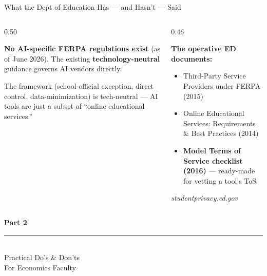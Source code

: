 \documentclass[aspectratio=169, 10pt]{beamer}
\newcommand{\cmcite}[1]{{\scriptsize\color{CoolGray}\textit{#1}}}
\begin{document}
\begin{frame}{What the Dept of Education Has --- and Hasn't --- Said}
\begin{columns}[T]
\begin{column}{0.50\textwidth}
\begin{tcolorbox}[keybox, title={\faGavel\quad No AI-specific rules}]
\small \textbf{No AI-specific FERPA regulations exist} (as of June 2026). The existing \textbf{technology-neutral} guidance governs AI vendors directly.
\end{tcolorbox}
\vskip4pt
\begin{tcolorbox}[quotebox, top=3pt, bottom=3pt]
\scriptsize The framework (school-official exception, direct control, data-minimization) is tech-neutral --- AI tools are just a subset of ``online educational services.''
\end{tcolorbox}
\end{column}
\begin{column}{0.46\textwidth}
\begin{tcolorbox}[accentbox]
\small
\textbf{The operative ED documents:}
\vskip3pt
\begin{itemize}\setlength{\itemsep}{2pt}
  \item Third-Party Service Providers under FERPA (2015)
  \item Online Educational Services: Requirements \& Best Practices (2014)
  \item \textbf{Model Terms of Service checklist (2016)} --- ready-made for vetting a tool's ToS
\end{itemize}
\end{tcolorbox}
\vskip3pt
\cmcite{studentprivacy.ed.gov}
\end{column}
\end{columns}
\end{frame}

{
\begin{frame}
\centering\vfill
{\fontsize{22}{28}\bfseries\selectfont\color{white} Part 2}\\[6pt]
{\color{UVMGold}\rule{5cm}{0.8pt}}\\[6pt]
{\normalsize\color{UVMGold} Practical Do's \& Don'ts}\\[4pt]
{\small\color{PaleSage} For Economics Faculty}
\vfill
\end{frame}
}
\end{document}
